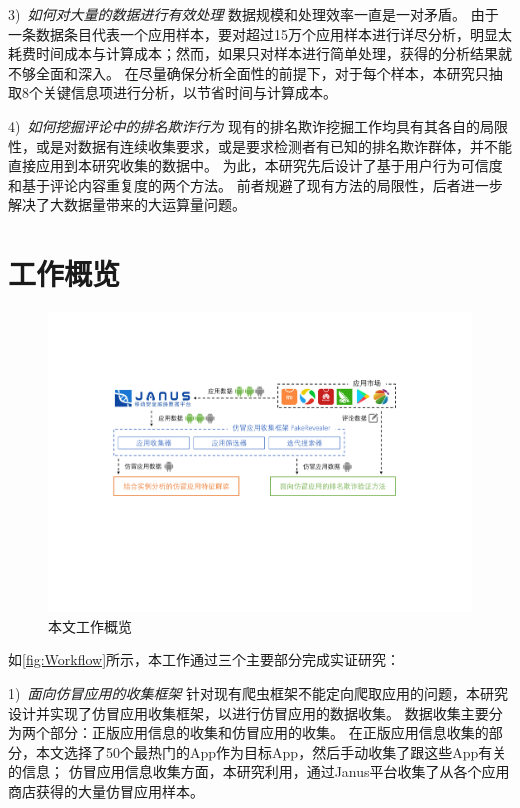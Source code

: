3)\	\emph{如何对大量的数据进行有效处理} \quad
数据规模和处理效率一直是一对矛盾。
由于一条数据条目代表一个应用样本，要对超过15万个应用样本进行详尽分析，明显太耗费时间成本与计算成本；然而，如果只对样本进行简单处理，获得的分析结果就不够全面和深入。
在尽量确保分析全面性的前提下，对于每个样本，本研究只抽取8个关键信息项进行分析，以节省时间与计算成本。

4)\ \emph{如何挖掘评论中的排名欺诈行为} \quad
现有的排名欺诈挖掘工作均具有其各自的局限性，或是对数据有连续收集要求，或是要求检测者有已知的排名欺诈群体，并不能直接应用到本研究收集的数据中。
为此，本研究先后设计了基于用户行为可信度和基于评论内容重复度的两个方法。
前者规避了现有方法的局限性，后者进一步解决了大数据量带来的大运算量问题。

\section{工作概览}

\begin{figure}[htbp]
	\centering
	\includegraphics[width=\textwidth]{./Figures/edwin-overview}
	\caption{本文工作概览}
	\label{fig:Workflow}
	\vspace{-3mm}
\end{figure}

如\autoref{fig:Workflow}所示，本工作通过三个主要部分完成实证研究：

1)\ \emph{面向仿冒应用的收集框架\mytool } \quad
针对现有爬虫框架不能定向爬取应用的问题，本研究设计并实现了仿冒应用收集框架\mytool，以进行仿冒应用的数据收集。
数据收集主要分为两个部分：正版应用信息的收集和仿冒应用的收集。
在正版应用信息收集的部分，本文选择了50个最热门的App作为目标App，然后手动收集了跟这些App有关的信息；
仿冒应用信息收集方面，本研究利用\mytool，通过Janus平台收集了从各个应用商店获得的大量仿冒应用样本。

